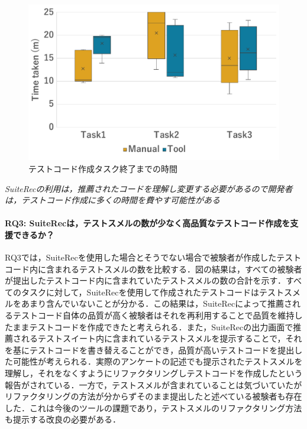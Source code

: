 \documentclass[12pt]{jarticle} %
\begin{document}
\begin{figure}[htbp]
  \begin{center}
   \includegraphics[width=12cm]{time.pdf}
  \caption{テストコード作成タスク終了までの時間}
  \label{time}
  \end{center}
\end{figure}

\begin{breakbox}
\textit{{\sf SuiteRec}の利用は，推薦されたコードを理解し変更する必要があるので開発者は，テストコード作成に多くの時間を費やす可能性がある}
\end{breakbox}



\paragraph{RQ3: {\sf SuiteRec}は，テストスメルの数が少なく高品質なテストコード作成を支援できるか？}RQ3では，{\sf SuiteRec}を使用した場合とそうでない場合で被験者が作成したテストコード内に含まれるテストスメルの数を比較する．図の結果は，すべての被験者が提出したテストコード内に含まれていたテストスメルの数の合計を示す．すべてのタスクに対して，{\sf SuiteRec}を使用して作成されたテストコードはテストスメルをあまり含んでいないことが分かる．この結果は，{\sf SuiteRec}によって推薦されるテストコード自体の品質が高く被験者はそれを再利用することで品質を維持したままテストコードを作成できたと考えられる．また，{\sf SuiteRec}の出力画面で推薦されるテストスイート内に含まれているテストスメルを提示することで，それを基にテストコードを書き替えることができ，品質が高いテストコードを提出した可能性が考えられる．実際のアンケートの記述でも提示されたテストスメルを理解し，それをなくすようにリファクタリングしテストコードを作成したという報告がされている．一方で，テストスメルが含まれていることは気づいていたがリファクタリングの方法が分からずそのまま提出したと述べている被験者も存在した．これは今後のツールの課題であり，テストスメルのリファクタリング方法も提示する改良の必要がある．
\end{document}
